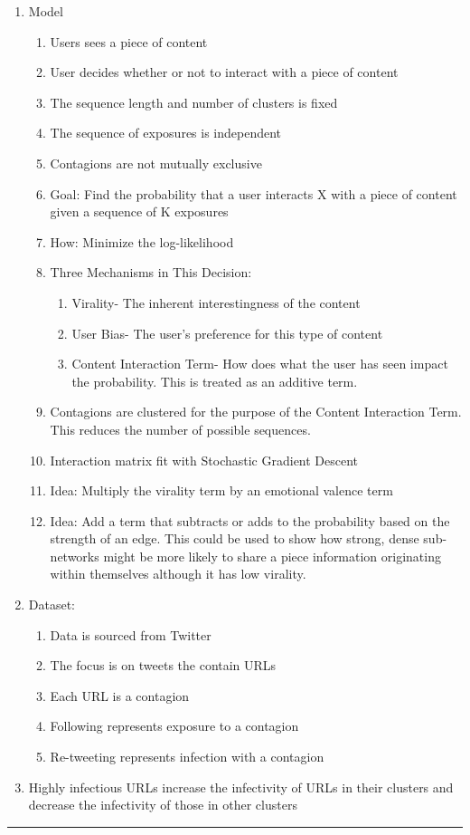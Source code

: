 \documentclass[11pt]{article}
\begin{document}
\begin{enumerate}
    \item Model 
    \begin{enumerate}
        \item Users sees a piece of content
        \item User decides whether or not to interact with a piece of content
        \item The sequence length and number of clusters is fixed
        \item The sequence of exposures is independent
        \item Contagions are not mutually exclusive
        \item Goal: Find the probability that a user interacts X with a piece of content given a sequence of K exposures
         \item How: Minimize the log-likelihood
        \item Three Mechanisms in This Decision: 
        \begin{enumerate}
            \item Virality- The inherent interestingness of the content
            \item User Bias- The user's preference for this type of content
            \item Content Interaction Term- How does what the user has seen impact the probability. This is treated as an additive term.
        \end{enumerate}
        \item Contagions are clustered for the purpose of the Content Interaction Term. This reduces the number of possible sequences.
        \item Interaction matrix fit with Stochastic Gradient Descent
        \item Idea: Multiply the virality term by an emotional valence term 
        \item Idea: Add a term that subtracts or adds to the probability based on the strength of an edge. This could be used to show how strong, dense sub-networks might be more likely to share a piece information originating within themselves although it has low virality.
    \end{enumerate}
    \item Dataset:
    \begin{enumerate}
        \item Data is sourced from Twitter
        \item The focus is on tweets the contain URLs
        \item Each URL is a contagion
        \item Following represents exposure to a contagion
        \item Re-tweeting represents infection with a contagion
    \end{enumerate}
    \item Highly infectious URLs increase the infectivity of URLs in their clusters and decrease the infectivity of those in other clusters
    
\end{enumerate}
\noindent
\rule{\textwidth}{0.01in}
\end{document}
